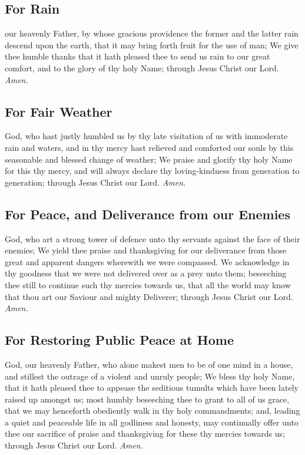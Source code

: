 \subsection{For Rain}
 our heavenly Father, by whose gracious providence the former and the latter rain descend upon the earth, that it may bring forth fruit for the use of man; We give thee humble thanks that it hath pleased thee to send us rain to our great comfort, and to the glory of thy holy Name; through Jesus Christ our Lord. \textit{Amen.}

\clearpage
\subsection{For Fair Weather}
 God, who hast justly humbled us by thy late visitation of us with immoderate rain and waters, and in thy mercy hast relieved and comforted our souls by this seasonable and blessed change of weather; We praise and glorify thy holy Name for this thy mercy, and will always declare thy loving-kindness from generation to generation; through Jesus Christ our Lord. \textit{Amen.}

\subsection{For Peace, and Deliverance from our Enemies}
 God, who art a strong tower of defence unto thy servants against the face of their enemies; We yield thee praise and thanksgiving for our deliverance from those great and apparent dangers wherewith we were compassed. We acknowledge in thy goodness that we were not delivered over as a prey unto them; beseeching thee still to continue such thy mercies towards us, that all the world may know that thou art our Saviour and mighty Deliverer; through Jesus Christ our Lord. \textit{Amen.}

\subsection{For Restoring Public Peace at Home}
 God, our heavenly Father, who alone makest men to be of one mind in a house, and stillest the outrage of a violent and unruly people; We bless thy holy Name, that it hath pleased thee to appease the seditious tumults which have been lately raised up amongst us; most humbly beseeching thee to grant to all of us grace, that we may henceforth obediently walk in thy holy commandments; and, leading a quiet and peaceable life in all godliness and honesty, may continually offer unto thee our sacrifice of praise and thanksgiving for these thy mercies towards us; through Jesus Christ our Lord. \textit{Amen.}

